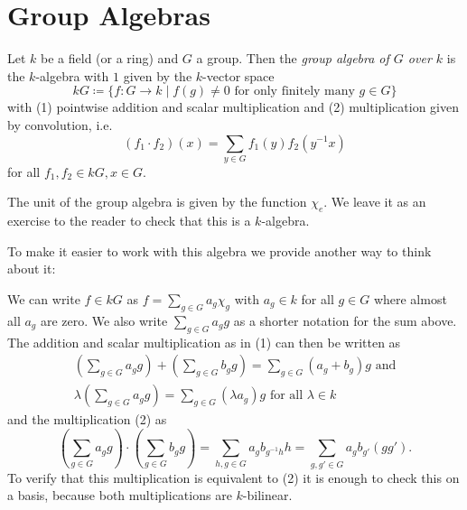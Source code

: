 \section{Group Algebras}


\begin{defi}
  Let $k$ be a field (or a ring) and $G$ a group.
  Then the \emph{group algebra of $G$ over $k$} is the $k$-algebra with $1$ given by the $k$-vector space
  \[
              kG
    \coloneqq \{
                f \colon G \to k
              \mid
                f(g) \neq 0 \text{ for only finitely many } g \in G
              \}
  \]
  with (1) pointwise addition and scalar multiplication and (2) multiplication given by convolution, i.e.\
  \[
      (f_1 \cdot f_2)(x)
    = \sum_{y \in G} f_1(y) f_2\left( y^{-1}x \right)
  \]
  for all $f_1, f_2 \in kG, x \in G$.
\end{defi}

The unit of the group algebra is given by the function $\chi_e$.
We leave it as an exercise to the reader to check that this is a $k$-algebra.

To make it easier to work with this algebra we provide another way to think about it:

We can write $f \in kG$ as $f = \sum_{g \in G} a_g \chi_g$ with $a_g \in k$ for all $g \in G$ where almost all $a_g$ are zero.
We also write $\sum_{g \in G} a_g g$ as a shorter notation for the sum above.
The addition and scalar multiplication as in (1) can then be written as
\begin{gather*}
      \left( \sum_{g \in G} a_g g \right)
    + \left( \sum_{g \in G} b_g g \right)
  = \sum_{g \in G} (a_g + b_g) g
  \text{ and}
  \\
    \lambda \left( \sum_{g \in G} a_g g \right)
  = \sum_{g \in G} (\lambda a_g) g
    \text{ for all }
    \lambda \in k
\end{gather*}
and the multiplication (2) as
\[
          \left( \sum_{g \in G} a_g g \right)
    \cdot \left( \sum_{g \in G} b_g g \right)
  = \sum_{h, g \in G} a_g b_{g^{-1}h} h
  = \sum_{g, g' \in G} a_g b_{g'} (g g').
\]
To verify that this multiplication is equivalent to (2) it is enough to check this on a basis, because both multiplications are $k$-bilinear.

